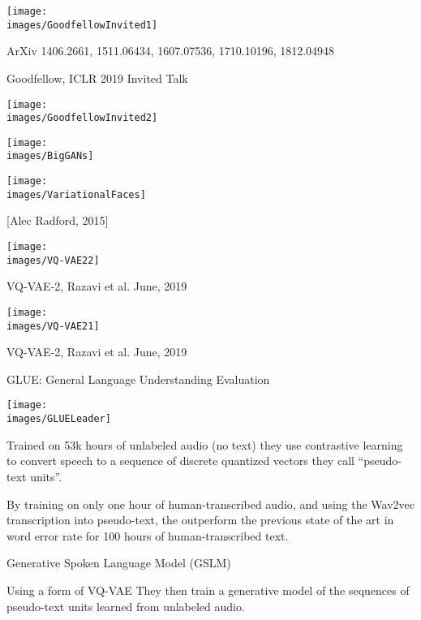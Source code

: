{{
\centerline{\texttt{[image: \\images/GoodfellowInvited1]}}

ArXiv 1406.2661, 1511.06434, 1607.07536, 1710.10196, 1812.04948

\centerline{Goodfellow, ICLR 2019 Invited Talk}


\centerline{\texttt{[image: \\images/GoodfellowInvited2]}}


\centerline{\texttt{[image: \\images/BigGANs]}}


\centerline{\texttt{[image: \\images/VariationalFaces]}}
\centerline{[Alec Radford, 2015]}


\centerline{\texttt{[image: \\images/VQ-VAE22]}}

\vfill
VQ-VAE-2, Razavi et al. June, 2019


\centerline{\texttt{[image: \\images/VQ-VAE21]}}

\vfill
VQ-VAE-2, Razavi et al. June, 2019


GLUE: General Language Understanding Evaluation

\centerline{\texttt{[image: \\images/GLUELeader]}}


\vfill
Trained on 53k hours of unlabeled audio (no text) they use {\color{red} contrastive learning} to convert speech to a sequence of discrete {\color{red} quantized vectors} they call ``pseudo-text units''.

\vfill
By training on only one hour of human-transcribed audio, and using the Wav2vec transcription into pseudo-text, the outperform the previous state of the
art in word error rate for 100 hours of human-transcribed text.



Generative Spoken Language Model (GSLM)

\vfill
Using a form of {\color{red} VQ-VAE} They then train a generative model of the sequences of pseudo-text units learned from unlabeled audio.


}}
